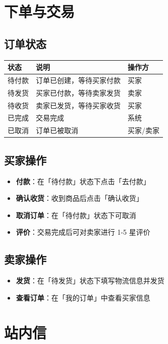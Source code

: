 \documentclass[12pt,a4paper,UTF8]{ctexart}
\begin{document}
\section{下单与交易}

\subsection{订单状态}

\begin{table}[H]
\centering
\begin{tabularx}{\textwidth}{lXl}
\toprule
\textbf{状态} & \textbf{说明} & \textbf{操作方} \\
\midrule
待付款 & 订单已创建，等待买家付款 & 买家 \\
待发货 & 买家已付款，等待卖家发货 & 卖家 \\
待收货 & 卖家已发货，等待买家收货 & 买家 \\
已完成 & 交易完成 & 系统 \\
已取消 & 订单已被取消 & 买家/卖家 \\
\bottomrule
\end{tabularx}
\end{table}

\subsection{买家操作}
\begin{itemize}
    \item \textbf{付款}：在「待付款」状态下点击「去付款」
    \item \textbf{确认收货}：收到商品后点击「确认收货」
    \item \textbf{取消订单}：在「待付款」状态下可取消
    \item \textbf{评价}：交易完成后可对卖家进行 1-5 星评价
\end{itemize}

\subsection{卖家操作}
\begin{itemize}
    \item \textbf{发货}：在「待发货」状态下填写物流信息并发货
    \item \textbf{查看订单}：在「我的订单」中查看买家信息
\end{itemize}

\section{站内信}
\end{document}

